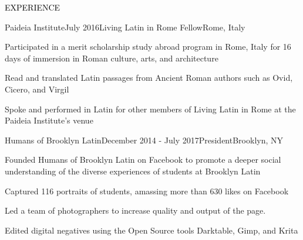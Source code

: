 \documentclass{resume} %
\renewenvironment{rSection}[1]{
\sectionskip
\textcolor{Black}{\MakeUppercase{#1}}
\sectionlineskip
\begin{list}{}{
\setlength{\leftmargin}{1.5em}
}
\item[]
}{
\end{list}
}
\begin{document}
\begin{rSection}{Experience}
  \begin{rSubsection}{Paideia Institute}{July 2016}{Living Latin in Rome Fellow}{Rome, Italy}
    \item Participated in a merit scholarship study abroad program in Rome, Italy for 16 days of immersion in Roman culture, arts, and architecture
    \item Read and translated Latin passages from Ancient Roman authors such as Ovid, Cicero, and Virgil
    \item Spoke and performed in Latin for other members of Living Latin in Rome at the Paideia Institute's venue
  \end{rSubsection}

  \begin{rSubsection}{Humans of Brooklyn Latin}{December 2014 - July 2017}{President}{Brooklyn, NY}
    \item Founded Humans of Brooklyn Latin on Facebook to promote a deeper social understanding of the diverse experiences of students at Brooklyn Latin
    \item Captured 116 portraits of students, amassing more than 630 likes on Facebook
    \item Led a team of photographers to increase quality and output of the page.
    \item Edited digital negatives using the Open Source tools Darktable, Gimp, and Krita
  \end{rSubsection}

\end{rSection}


\end{document}

